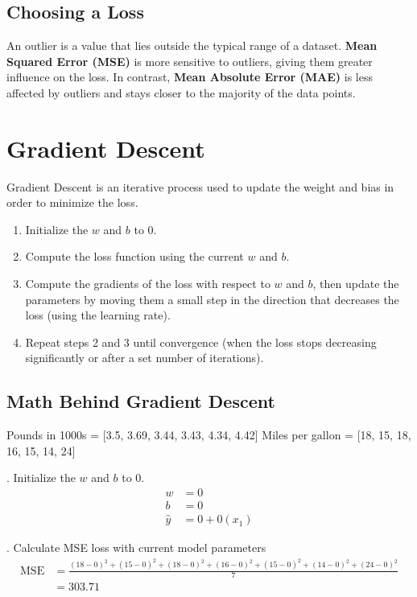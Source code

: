 \documentclass[a4paper,12pt]{article}
\begin{document}
\subsection{Choosing a Loss}
An outlier is a value that lies outside the typical range of a dataset. \textbf{Mean Squared Error (MSE)} is more sensitive to outliers, giving them greater influence on the loss. In contrast, \textbf{Mean Absolute Error (MAE)} is less affected by outliers and stays closer to the majority of the data points.


\section{Gradient Descent}
Gradient Descent is an iterative process used to update the weight and bias in order to minimize the loss.
\begin{enumerate}
    \item Initialize the $w$ and $b$ to 0.
    \item Compute the loss function using the current $w$ and $b$.
    \item Compute the gradients of the loss with respect to $w$ and $b$, then update the parameters by moving them a small step in the direction that decreases the loss (using the learning rate).
    \item Repeat steps 2 and 3 until convergence (when the loss stops decreasing significantly or after a set number of iterations).
\end{enumerate}

\subsection{Math Behind Gradient Descent}
Pounds in 1000s = [3.5, 3.69, 3.44, 3.43, 4.34, 4.42] \newline
Miles per gallon = [18, 15, 18, 16, 15, 14, 24] \newline

. Initialize the $w$ and $b$ to 0.
\begin{align}
w &= 0 \\
b &= 0 \\
\hat{y} &= 0 + 0(x_1)
\end{align}

. Calculate MSE loss with current model parameters
\begin{align}
\text{MSE} &= \frac{(18-0)^2 + (15-0)^2 + (18-0)^2 + (16-0)^2 + (15-0)^2 + (14-0)^2 + (24-0)^2}{7} \\
 &= 303.71
\end{align}
\end{document}
